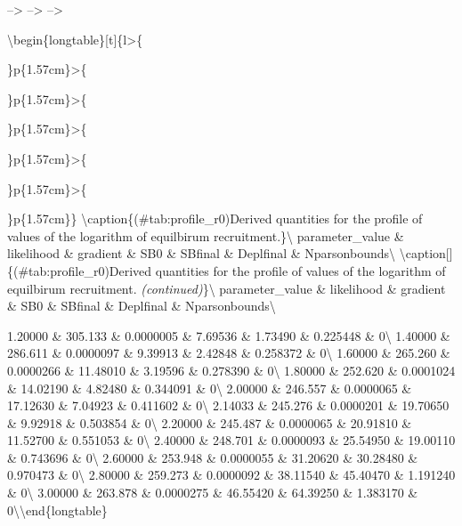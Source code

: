 \documentclass[11pt,
  english,
  a4paper,
]{article}
\begin{document}
\newpage


--\textgreater{} --\textgreater{} --\textgreater{}

\leavevmode\tagmcend\tagstructend\par

\begingroup\fontsize{10}{12}\selectfont
\begingroup\fontsize{10}{12}\selectfont


\textbackslash begin\{longtable\}{[}t{]}\{l\textgreater\{\raggedright\arraybackslash\}p\{1.57cm\}\textgreater\{\raggedright\arraybackslash\}p\{1.57cm\}\textgreater\{\raggedright\arraybackslash\}p\{1.57cm\}\textgreater\{\raggedright\arraybackslash\}p\{1.57cm\}\textgreater\{\raggedright\arraybackslash\}p\{1.57cm\}\textgreater\{\raggedright\arraybackslash\}p\{1.57cm\}\} \textbackslash caption\{(\#tab:profile\_r0)Derived quantities for the profile of values of the logarithm of equilbirum recruitment.\}\textbackslash{} \toprule parameter\_value \& likelihood \& gradient \& SB0 \& SBfinal \& Deplfinal \& Nparsonbounds\textbackslash{} \midrule \endfirsthead \textbackslash caption{[}{]}\{(\#tab:profile\_r0)Derived quantities for the profile of values of the logarithm of equilbirum recruitment. \textit{(continued)}\}\textbackslash{} \toprule parameter\_value \& likelihood \& gradient \& SB0 \& SBfinal \& Deplfinal \& Nparsonbounds\textbackslash{} \midrule \endhead

\leavevmode\tagmcend\tagstructend\par

\endfoot
\bottomrule
\endlastfoot


1.20000 \& 305.133 \& 0.0000005 \& 7.69536 \& 1.73490 \& 0.225448 \& 0\textbackslash{} 1.40000 \& 286.611 \& 0.0000097 \& 9.39913 \& 2.42848 \& 0.258372 \& 0\textbackslash{} 1.60000 \& 265.260 \& 0.0000266 \& 11.48010 \& 3.19596 \& 0.278390 \& 0\textbackslash{} 1.80000 \& 252.620 \& 0.0001024 \& 14.02190 \& 4.82480 \& 0.344091 \& 0\textbackslash{} 2.00000 \& 246.557 \& 0.0000065 \& 17.12630 \& 7.04923 \& 0.411602 \& 0\textbackslash{} 2.14033 \& 245.276 \& 0.0000201 \& 19.70650 \& 9.92918 \& 0.503854 \& 0\textbackslash{} 2.20000 \& 245.487 \& 0.0000065 \& 20.91810 \& 11.52700 \& 0.551053 \& 0\textbackslash{} 2.40000 \& 248.701 \& 0.0000093 \& 25.54950 \& 19.00110 \& 0.743696 \& 0\textbackslash{} 2.60000 \& 253.948 \& 0.0000055 \& 31.20620 \& 30.28480 \& 0.970473 \& 0\textbackslash{} 2.80000 \& 259.273 \& 0.0000092 \& 38.11540 \& 45.40470 \& 1.191240 \& 0\textbackslash{} 3.00000 \& 263.878 \& 0.0000275 \& 46.55420 \& 64.39250 \& 1.383170 \& 0\textbackslash* \textbackslash end\{longtable\} \endgroup{} \endgroup{}
\end{document}
